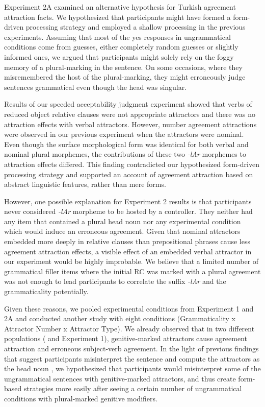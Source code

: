 Experiment 2A examined an alternative hypothesis for Turkish agreement attraction facts. We hypothesized that participants might have formed a form-driven processing strategy and employed a shallow processing in the previous experiments. Assuming that most of the yes responses in ungrammatical conditions come from guesses, either completely random guesses or slightly informed ones, we argued that participants might solely rely on the foggy memory of a plural-marking in the sentence. On some occasions, where they misremembered the host of the plural-marking, they might erroneously judge sentences grammatical even though the head was singular. 

Results of our speeded acceptability judgment experiment showed that verbs of reduced object relative clauses were not appropriate attractors and there was no attraction effects with verbal attractors. However, number agreement attractions were observed in our previous experiment when the attractors were nominal. Even though the surface morphological form was identical for both verbal and nominal plural morphemes, the contributions of these two \emph{-lAr} morphemes to attraction effects differed. This finding contradicted our hypothesized form-driven processing strategy and supported an account of agreement attraction based on abstract linguistic features, rather than mere forms.

However, one possible explanation for Experiment 2 results is that participants never considered \emph{-lAr} morpheme to be hosted by a controller. They neither had any item that contained a plural head noun nor any experimental condition which would induce an erroneous agreement. Given that nominal attractors embedded more deeply in relative clauses than prepositional phrases cause less agreement attraction effects, a visible effect of an embedded verbal attractor in our experiment would be highly improbable. We believe that a limited number of grammatical filler items where the initial RC was marked with a plural agreement was not enough to lead participants to correlate the suffix \emph{-lAr} and the grammaticality potentially. 

Given these reasons, we pooled experimental conditions from Experiment 1 and 2A and conducted another study with eight conditions (Grammaticality x Attractor Number x Attractor Type). We already observed that in two different populations ( and Experiment 1), genitive-marked attractors cause agreement attraction and erroneous subject-verb agreement. In the light of previous findings that suggest participants misinterpret the sentence and compute the attractors as the head noun \citep{PatsonHusband2016}, we hypothesized that participants would misinterpret some of the ungrammatical sentences with genitive-marked attractors, and thus create form-based strategies more easily after seeing a certain number of ungrammatical conditions with plural-marked genitive modifiers. 

